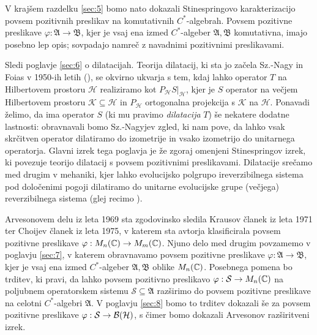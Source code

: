 V krajšem razdelku \ref{sec:5} bomo nato dokazali Stinespringovo karakterizacijo povsem pozitivnih 
preslikav na komutativnih $C^*$-algebrah. Povsem pozitivne preslikave $\varphi: \mathfrak{A} \to \mathfrak{B}$,
kjer je vsaj ena izmed $C^*$-algeber $\mathfrak{A}, \mathfrak{B}$ komutativna, imajo posebno lep opis; 
sovpadajo namreč z navadnimi pozitivnimi preslikavami.

Sledi poglavje \ref{sec:6} o dilatacijah.
Teorija dilatacij, ki sta jo začela Sz.-Nagy in Foias v 1950-ih letih (\cite{nagyfoias2010}),
se okvirno ukvarja s tem, kdaj lahko 
operator $T$ na Hilbertovem prostoru $\mathcal{H}$ realiziramo kot $P_{\mathcal{H}} S |_{\mathcal{H}}$,
kjer je $S$ operator na večjem Hilbertovem prostoru $\mathcal{K} \subseteq \mathcal{H}$
in $P_{\mathcal{H}}$ ortogonalna projekcija s $\mathcal{K}$ na $\mathcal{H}$.
Ponavadi želimo, da ima operator $S$ (ki mu pravimo \emph{dilatacija} $T$)
še nekatere dodatne lastnosti: obravnavali bomo Sz.-Nagyjev zgled,
ki nam pove, da lahko vsak skrčitven operator dilatiramo do izometrije
in vsako izometrijo do unitarnega operatorja. 
Glavni izrek tega poglavja je že zgoraj omenjeni Stinespringov izrek, ki povezuje teorijo dilatacij s povsem pozitivnimi preslikavami.
Dilatacije srečamo med drugim v mehaniki,
kjer lahko evolucijsko polgrupo ireverzibilnega sistema pod določenimi pogoji dilatiramo do unitarne evolucijske grupe (večjega) reverzibilnega sistema 
(glej recimo \cite{MielkePeletierZimmer2025}).

Arvesonovem delu iz leta 1969 sta zgodovinsko sledila Krausov članek \cite{kraus1971} iz leta 1971 
ter Choijev članek \cite{choi1975} iz leta 1975, v katerem sta avtorja klasificirala povsem pozitivne preslikave $\varphi: M_n (\mathbb C) \to M_m(\mathbb C)$.
Njuno delo med drugim povzamemo v poglavju \ref{sec:7}, v katerem obravnavamo povsem pozitivne preslikave $\varphi: \mathfrak{A} \to \mathfrak{B}$,
kjer je vsaj ena izmed $C^*$-algeber $\mathfrak{A}, \mathfrak{B}$ oblike $M_n (\mathbb C)$. 
Posebnega pomena bo trditev, ki pravi, da lahko povsem pozitivno preslikavo $\varphi: \mathcal{S} \to M_n (\mathbb C)$
na poljubnem operatorskem sistemu $\mathcal{S} \subseteq \mathfrak{A}$ razširimo do povsem pozitivne preslikave na celotni $C^*$-algebri $\mathfrak{A}$.
V poglavju \ref{sec:8} bomo to trditev dokazali še za povsem pozitivne preslikave $\varphi: \mathcal{S} \to \operatorname{\mathcal{B} (\mathcal{H})}$,
s čimer bomo dokazali Arvesonov razširitveni izrek.

